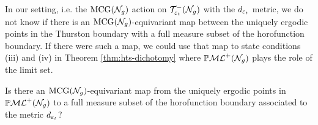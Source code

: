 \begin{remark}
  In our setting, i.e. the $\mathrm{MCG}(\mathcal{N}_g)$ action on $\mathcal{T}_{\varepsilon_t}^{-}(\mathcal{N}_g)$ with the $d_{\varepsilon_t}$ metric, we do not know if there is an $\mathrm{MCG}(\mathcal{N}_g)$-equivariant map between the uniquely ergodic points in the Thurston boundary with a full measure subset of the horofunction boundary.
  If there were such a map, we could use that map to state conditions (iii) and (iv) in Theorem \ref{thm:hts-dichotomy} where $\mathbb{P}\mathcal{ML}^+(\mathcal{N}_g)$ plays the role of the limit set.
  \begin{question}
  \label{ques:horoboundary}
    Is there an $\mathrm{MCG}(\mathcal{N}_g)$-equivariant map from the uniquely ergodic points in $\mathbb{P}\mathcal{ML}^+(\mathcal{N}_g)$ to a full measure subset of the horofunction boundary associated to the metric $d_{\varepsilon_t}$?
  \end{question}
\end{remark}






